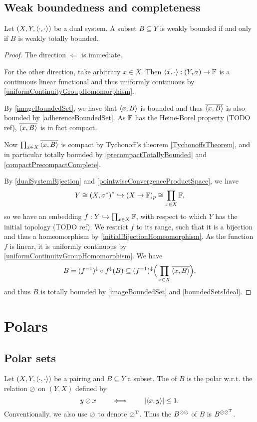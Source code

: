\subsection{Weak boundedness and completeness}
\begin{proposition} \label{weakBoundedness}
Let $\left( X,Y,\left\langle \cdot,\cdot \right\rangle \right)$ be a dual system. A subset $B\subseteq Y$ is weakly bounded \textup{if and only if} $B$ is weakly totally bounded.
\end{proposition}
\begin{proof}
The direction $\Leftarrow$ is immediate.

For the other direction, take arbitrary $x\in X$. Then $\left\langle x,\cdot \right\rangle: \left( Y,\sigma \right)\to \mathbb{F}$ is a continuous linear functional and thus uniformly continuous by \ref{uniformContinuityGroupHomomorphism}. 

By \ref{imageBoundedSet}, we have that $\left\langle x, B \right\rangle$ is bounded and thus $\overline{\left\langle x,B \right\rangle}$ is also bounded by \ref{adherenceBoundedSet}. As $\mathbb{F}$ has the Heine-Borel property (TODO ref), $\overline{\left\langle x,B \right\rangle}$ is in fact compact.

Now $\prod_{x\in X}\overline{\left\langle x, B \right\rangle}$ is compact by Tychonoff's theorem \ref{TychonoffsTheorem}, and in particular totally bounded by \ref{precompactTotallyBounded} and \ref{compactPrecompactComplete}.

By \ref{dualSystemBijection} and \ref{pointwiseConvergenceProductSpace}, we have
\[ Y \cong \left( X,\sigma^* \right)^* \hookrightarrow (X\to \mathbb{F})_p \cong \prod_{x\in X}\mathbb{F}, \]
so we have an embedding $f: Y \hookrightarrow \prod_{x\in X}\mathbb{F}$, with respect to which $Y$ has the initial topology (TODO ref). We restrict $f$ to its range, such that it is a bijection and thus a homeomorphism by \ref{initialBijectionHomeomorphism}. As the function $f$ is linear, it is uniformly continuous by \ref{uniformContinuityGroupHomomorphism}.
We have
\[ B = (f^{-1})^\downarrow\circ f^\downarrow(B) \subseteq (f^{-1})^\downarrow\Big(\prod_{x\in X}\overline{\left\langle x, B \right\rangle}\Big), \]
and thus $B$ is totally bounded by \ref{imageBoundedSet} and \ref{boundedSetsIdeal}.
\end{proof}

\section{Polars}
\subsection{Polar sets}
\begin{definition}
Let $\left( X,Y,\left\langle \cdot,\cdot \right\rangle \right)$ be a pairing and $B\subseteq Y$ a subset. The  of $B$ is the polar w.r.t. the relation $\oslash$ on $(Y,X)$ defined by
\[ y\oslash x \qquad\iff\qquad \left|\left\langle x, y \right\rangle\right| \leq 1. \]
Conventionally, we also use $\oslash$ to denote $\oslash^{\mathrm{T}}$. Thus the  $B^{\oslash\oslash}$ of $B$ is $B^{\oslash\oslash^{\mathrm{T}}}$.
\end{definition}

